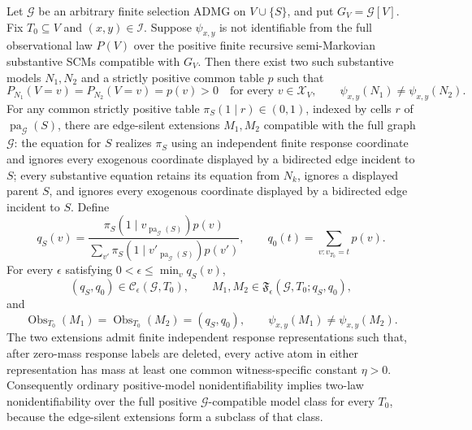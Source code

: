 Let \(\mathcal G\) be an arbitrary finite selection ADMG on \(V\cup\{S\}\), and put \(G_V=\mathcal G[V]\). Fix \(T_0\subseteq V\) and \((x,y)\in\mathcal I\). Suppose \(\psi_{x,y}\) is not identifiable from the full observational law \(P(V)\) over the positive finite recursive semi-Markovian substantive SCMs compatible with \(G_V\). Then there exist two such substantive models \(N_1,N_2\) and a strictly positive common table \(p\) such that
\[
 P_{N_1}(V=v)=P_{N_2}(V=v)=p(v)>0
 \quad\text{for every }v\in\mathcal X_V,
 \qquad
 \psi_{x,y}(N_1)\ne\psi_{x,y}(N_2).
\]
For any common strictly positive table \(\pi_S(1\mid r)\in(0,1)\), indexed by cells \(r\) of \(\operatorname{pa}_{\mathcal G}(S)\), there are edge-silent extensions \(M_1,M_2\) compatible with the full graph \(\mathcal G\): the equation for \(S\) realizes \(\pi_S\) using an independent finite response coordinate and ignores every exogenous coordinate displayed by a bidirected edge incident to \(S\); every substantive equation retains its equation from \(N_k\), ignores a displayed parent \(S\), and ignores every exogenous coordinate displayed by a bidirected edge incident to \(S\). Define
\[
 q_S(v)=
 \frac{\pi_S(1\mid v_{\operatorname{pa}_{\mathcal G}(S)})p(v)}
 {\sum_{v'}\pi_S(1\mid v'_{\operatorname{pa}_{\mathcal G}(S)})p(v')},
 \qquad
 q_0(t)=\sum_{v:v_{T_0}=t}p(v).
\]
For every \(\epsilon\) satisfying \(0<\epsilon\leq\min_v q_S(v)\),
\[
 (q_S,q_0)\in\mathcal C_{\epsilon}(\mathcal G,T_0),
 \qquad
 M_1,M_2\in\mathfrak F_{\epsilon}(\mathcal G,T_0;q_S,q_0),
\]
and
\[
 \operatorname{Obs}_{T_0}(M_1)=\operatorname{Obs}_{T_0}(M_2)=(q_S,q_0),
 \qquad
 \psi_{x,y}(M_1)\ne\psi_{x,y}(M_2).
\]
The two extensions admit finite independent response representations such that, after zero-mass response labels are deleted, every active atom in either representation has mass at least one common witness-specific constant \(\eta>0\). Consequently ordinary positive-model nonidentifiability implies two-law nonidentifiability over the full positive \(\mathcal G\)-compatible model class for every \(T_0\), because the edge-silent extensions form a subclass of that class.